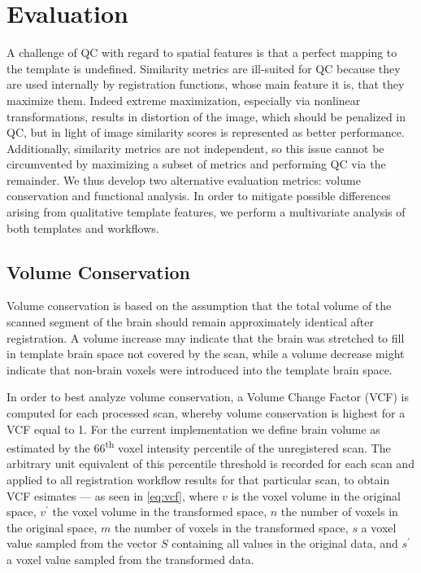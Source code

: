 \section{Evaluation}


A challenge of QC with regard to spatial features is that a perfect mapping to the template is undefined.
Similarity metrics are ill-suited for QC because they are used internally by registration functions, whose main feature it is, that they maximize them.
Indeed extreme maximization, especially via nonlinear transformations, results in distortion of the image, which should be penalized in QC, but in light of image similarity scores is represented as better performance.
Additionally, similarity metrics are not independent, so this issue cannot be circumvented by maximizing a subset of metrics and performing QC via the remainder.
We thus develop two alternative evaluation metrics: volume conservation and functional analysis.
In order to mitigate possible differences arising from qualitative template features, we perform a multivariate analysis of both templates and workflows.

\subsection{Volume Conservation}

Volume conservation is based on the assumption that the total volume of the scanned segment of the brain should remain approximately identical after registration.
A volume increase may indicate that the brain was stretched to fill in template brain space not covered by the scan, while a volume decrease might indicate that non-brain voxels were introduced into the template brain space.

In order to best analyze volume conservation, a Volume Change Factor (VCF) is computed for each processed scan, whereby volume conservation is highest for a VCF equal to 1.
For the current implementation we define brain volume as estimated by the 66\textsuperscript{th} voxel intensity percentile of the unregistered scan.
The arbitrary unit equivalent of this percentile threshold is recorded for each scan and applied to all registration workflow results for that particular scan, to obtain VCF esimates
 --- as seen in \cref{eq:vcf}, where $v$ is the voxel volume in the original space, $v^\prime$ the voxel volume in the transformed space, $n$ the number of voxels in the original space, $m$ the number of voxels in the transformed space, $s$ a voxel value sampled from the vector $S$ containing all values in the original data, and $s^\prime$ a voxel value sampled from the transformed data.

